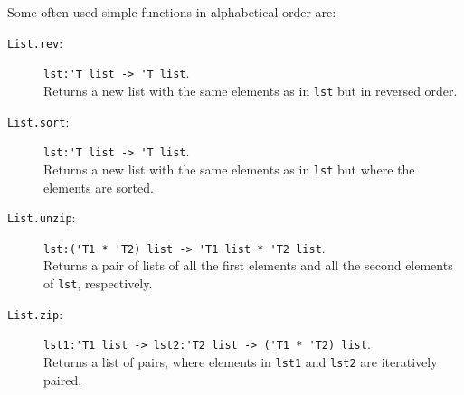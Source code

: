 \documentclass[fsharpNotes.tex]{subfiles}
\begin{document}
Some often used simple functions in alphabetical order are:
\begin{description}
\item[\texttt{List.rev}:] \lstinline{lst:'T list -> 'T list}.~\\
  Returns a new list with the same elements as in \lstinline{lst} but in reversed order.
\item[\texttt{List.sort}:] \lstinline{lst:'T list -> 'T list}.~\\
  Returns a new list with the same elements as in \lstinline{lst} but where the elements are sorted.
\item[\texttt{List.unzip}:] \lstinline{lst:('T1 * 'T2) list -> 'T1 list * 'T2 list}.~\\
  Returns a pair of lists of all the first elements and all the second elements of \lstinline{lst}, respectively.
\item[\texttt{List.zip}:] \lstinline{lst1:'T1 list -> lst2:'T2 list -> ('T1 * 'T2) list}.~\\
  Returns a list of pairs, where elements in \lstinline{lst1} and \lstinline{lst2} are iteratively paired.
\end{description}
\end{document}
